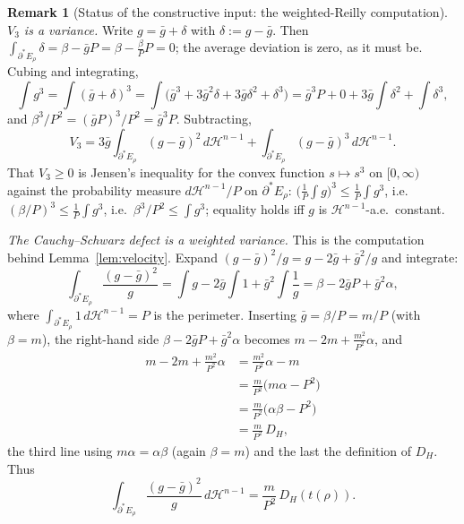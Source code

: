 \documentclass[11pt]{amsart}
\theoremstyle{definition}
\newtheorem{remark}[theorem]{Remark}
\newcommand{\Hn}{\mathcal H^{n-1}}
\begin{document}
\begin{remark}[Status of the constructive input: the weighted-Reilly computation]
\emph{\(V_3\) is a variance.}  Write \(g=\bar g+\delta\) with
\(\delta:=g-\bar g\).  Then \(\int_{\partial^*E_\rho}\delta=\beta-\bar gP=
\beta-\tfrac\beta P P=0\); the average deviation is zero, as it must be.
Cubing and integrating,
\[
   \int g^3=\int(\bar g+\delta)^3
   =\int\bigl(\bar g^3+3\bar g^2\delta+3\bar g\delta^2+\delta^3\bigr)
   =\bar g^3P+0+3\bar g\!\int\delta^2+\int\delta^3 ,
\]
and \(\beta^3/P^2=(\bar gP)^3/P^2=\bar g^3P\).  Subtracting,
\begin{equation}\label{eq:V3-variance}
   V_3=3\bar g\int_{\partial^*E_\rho}(g-\bar g)^2\,d\Hn
       +\int_{\partial^*E_\rho}(g-\bar g)^3\,d\Hn .
\end{equation}
That \(V_3\ge0\) is Jensen's inequality for the convex function \(s\mapsto s^3\)
on \([0,\infty)\) against the probability measure \(d\Hn/P\) on
\(\partial^*E_\rho\): \(\bigl(\tfrac1P\int g\bigr)^3\le\tfrac1P\int g^3\), i.e.\
\((\beta/P)^3\le\tfrac1P\int g^3\), i.e.\ \(\beta^3/P^2\le\int g^3\); equality
holds iff \(g\) is \(\Hn\)-a.e.\ constant.

\emph{The Cauchy--Schwarz defect is a weighted variance.}  This is the
computation behind Lemma~\ref{lem:velocity}.  Expand
\((g-\bar g)^2/g=g-2\bar g+\bar g^2/g\) and integrate:
\[
   \int_{\partial^*E_\rho}\frac{(g-\bar g)^2}{g}
   =\int g-2\bar g\int1+\bar g^2\int\frac1g
   =\beta-2\bar gP+\bar g^2\alpha ,
\]
where \(\int_{\partial^*E_\rho}1\,d\Hn=P\) is the perimeter.  Inserting
\(\bar g=\beta/P=m/P\) (with \(\beta=m\)), the right-hand side
\(\beta-2\bar gP+\bar g^2\alpha\) becomes \(m-2m+\tfrac{m^2}{P^2}\alpha\), and
\[
\begin{aligned}
   m-2m+\frac{m^2}{P^2}\alpha
   &=\frac{m^2}{P^2}\alpha-m\\
   &=\frac{m}{P^2}\bigl(m\alpha-P^2\bigr)\\
   &=\frac{m}{P^2}\bigl(\alpha\beta-P^2\bigr)\\
   &=\frac{m}{P^2}\,D_H ,
\end{aligned}
\]
the third line using \(m\alpha=\alpha\beta\) (again \(\beta=m\)) and the last the
definition of \(D_H\).  Thus
\begin{equation}\label{eq:DH-variance}
   \int_{\partial^*E_\rho}\frac{(g-\bar g)^2}{g}\,d\Hn=\frac{m}{P^2}\,D_H(t(\rho)).
\end{equation}


\end{remark}
\end{document}
